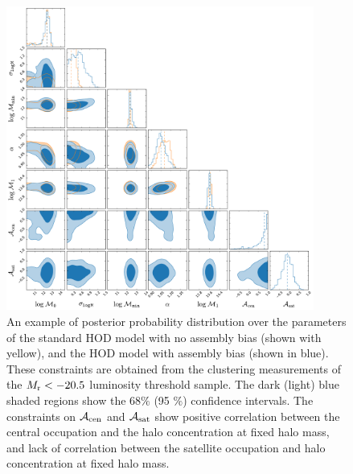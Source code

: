 \documentclass[12pt, preprint]{aastex}
\newcommand{\acen}{\mathcal{A}_{\rm cen}}
\newcommand{\asat}{\mathcal{A}_{\rm sat}}
\begin{document}
\begin{figure}[p]~\\
\begin{center}
\includegraphics[width=0.9\textwidth]{post20_5combined.pdf}
\caption{An example of posterior probability distribution over the parameters of the standard HOD model with no assembly bias (shown with yellow), and the HOD model with assembly bias (shown in blue). These constraints are obtained from the clustering measurements of the $M_{\rm r} < -20.5$ luminosity threshold sample. The dark (light) blue shaded regions show the 68$\%$ (95 $\%$) confidence intervals. The constraints on $\acen$ and $\asat$ show positive correlation between the central occupation and the halo concentration at fixed halo mass, and lack of correlation between the satellite occupation and halo concentration at fixed halo mass.}
\label{fig:posterior}
\end{center}
\end{figure}



\end{document}
